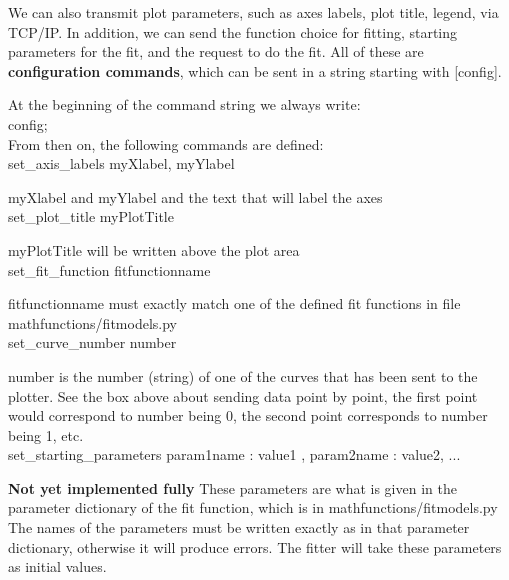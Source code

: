 \documentclass[11pt]{article} %
\begin{document}
We can also transmit plot parameters, such as axes labels, plot title, legend, via TCP/IP. In addition, we can send the function choice for fitting, starting parameters for the fit, and the request to do the fit. All of these are \textbf{configuration commands}, which can be sent in a string starting with [config].

\begin{tcolorbox}[title=Configuration command string (config)]

At the beginning of the command string we always write:
\\

{\selectfont config;}
\\

From then on, the following commands are defined: 
\\

{\selectfont set\_axis\_labels myXlabel, myYlabel}

myXlabel and myYlabel and the text that will label the axes
\\

{\selectfont set\_plot\_title myPlotTitle}

myPlotTitle will be written above the plot area
\\

{\selectfont set\_fit\_function fitfunctionname}

fitfunctionname must exactly match one of the defined fit functions in file mathfunctions/fitmodels.py
\\

{\selectfont set\_curve\_number number}

number is the number (string) of one of the curves that has been sent to the plotter. See the box above about sending data point by point, the first point would correspond to number being 0, the second point corresponds to number being 1, etc. 
\\

{\selectfont set\_starting\_parameters param1name : value1 , param2name : value2, ...}

\textbf{Not yet implemented fully}
These parameters are what is given in the parameter dictionary of the fit function, which is in mathfunctions/fitmodels.py The names of the parameters must be written exactly as in that parameter dictionary, otherwise it will produce errors. The fitter will take these parameters as initial values.  
\\


\end{tcolorbox}
\end{document}
